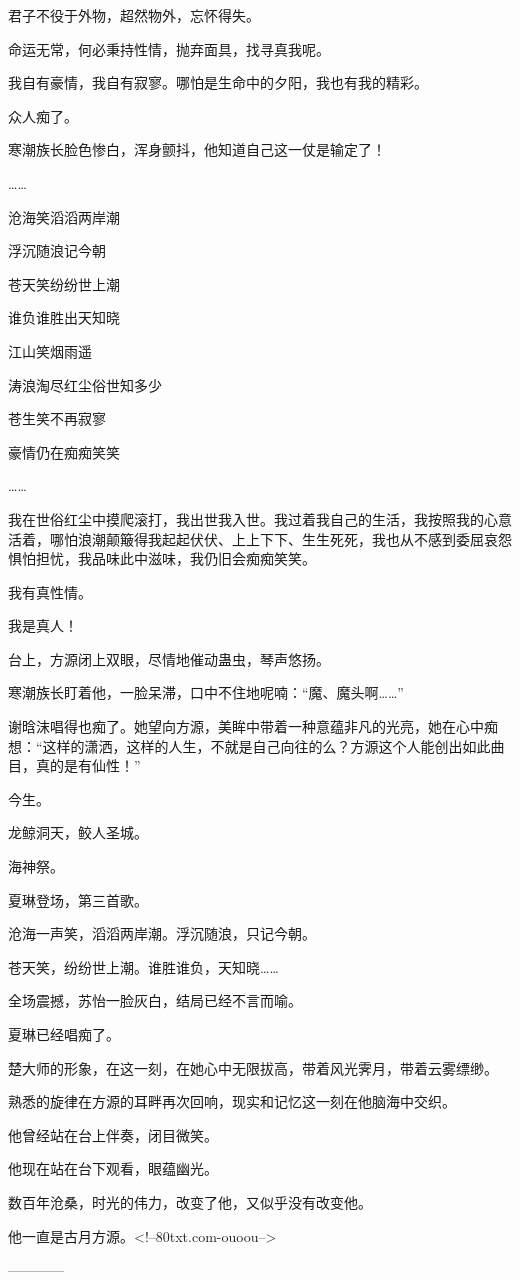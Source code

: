\begin{this_body}
君子不役于外物，超然物外，忘怀得失。

命运无常，何必秉持性情，抛弃面具，找寻真我呢。

我自有豪情，我自有寂寥。哪怕是生命中的夕阳，我也有我的精彩。

众人痴了。

寒潮族长脸色惨白，浑身颤抖，他知道自己这一仗是输定了！

……

沧海笑滔滔两岸潮

浮沉随浪记今朝

苍天笑纷纷世上潮

谁负谁胜出天知晓

江山笑烟雨遥

涛浪淘尽红尘俗世知多少

苍生笑不再寂寥

豪情仍在痴痴笑笑

……

我在世俗红尘中摸爬滚打，我出世我入世。我过着我自己的生活，我按照我的心意活着，哪怕浪潮颠簸得我起起伏伏、上上下下、生生死死，我也从不感到委屈哀怨惧怕担忧，我品味此中滋味，我仍旧会痴痴笑笑。

我有真性情。

我是真人！

台上，方源闭上双眼，尽情地催动蛊虫，琴声悠扬。

寒潮族长盯着他，一脸呆滞，口中不住地呢喃：“魔、魔头啊……”

谢晗沫唱得也痴了。她望向方源，美眸中带着一种意蕴非凡的光亮，她在心中痴想：“这样的潇洒，这样的人生，不就是自己向往的么？方源这个人能创出如此曲目，真的是有仙性！”

今生。

龙鲸洞天，鲛人圣城。

海神祭。

夏琳登场，第三首歌。

沧海一声笑，滔滔两岸潮。浮沉随浪，只记今朝。

苍天笑，纷纷世上潮。谁胜谁负，天知晓……

全场震撼，苏怡一脸灰白，结局已经不言而喻。

夏琳已经唱痴了。

楚大师的形象，在这一刻，在她心中无限拔高，带着风光霁月，带着云雾缥缈。

熟悉的旋律在方源的耳畔再次回响，现实和记忆这一刻在他脑海中交织。

他曾经站在台上伴奏，闭目微笑。

他现在站在台下观看，眼蕴幽光。

数百年沧桑，时光的伟力，改变了他，又似乎没有改变他。

他一直是古月方源。<!--80txt.com-ouoou-->

------------

\end{this_body}

